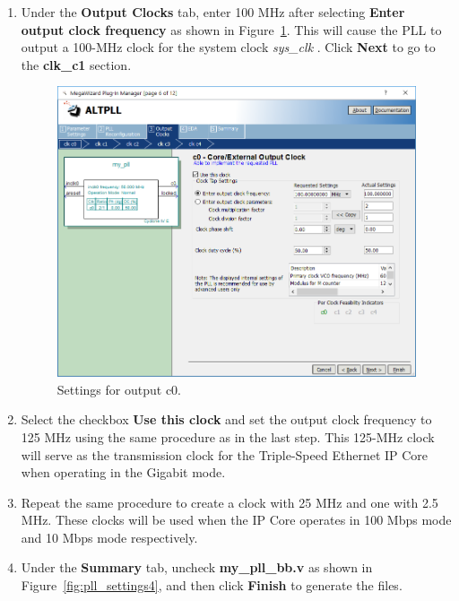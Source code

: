 \documentclass[11pt, twoside, pdftex]{article}
\begin{document}
\begin{enumerate}
	\item Under the {\bf Output Clocks} tab, enter 100 MHz after selecting {\bf Enter output clock frequency} as shown in Figure~\ref{fig:pll_settings3}. This will cause the PLL to output a 100-MHz clock for the system clock {\it sys\_clk} . Click {\bf Next} to go to the {\bf clk\_c1} section.
	
	\begin{figure}[H]
		\centering
		  \includegraphics[scale=0.5]{figures/pll_settings3.png}
		\caption{Settings for output c0.} 
		\label{fig:pll_settings3}
	\end{figure}
	
	\item Select the checkbox {\bf Use this clock} and set the output clock frequency to 125 MHz using the same procedure as in the last step. This 125-MHz clock will serve as the transmission clock for the Triple-Speed Ethernet IP Core when operating in the Gigabit mode.
	\item Repeat the same procedure to create a clock with 25 MHz and one with 2.5 MHz. These clocks will be used when the IP Core operates in 100 Mbps mode and 10 Mbps mode respectively. 
	\item Under the {\bf Summary} tab, uncheck {\bf my\_pll\_bb.v} as shown in Figure~\ref{fig:pll_settings4}, and then click {\bf Finish} to generate the files.	
	

\end{enumerate}
\end{document}
